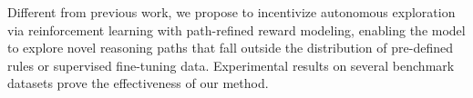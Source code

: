Different from previous work, we propose to incentivize autonomous exploration via reinforcement learning with path-refined reward modeling, enabling the model to explore novel reasoning paths that fall outside the distribution of pre-defined rules or supervised fine-tuning data.
Experimental results on several benchmark datasets prove the effectiveness of our method.











